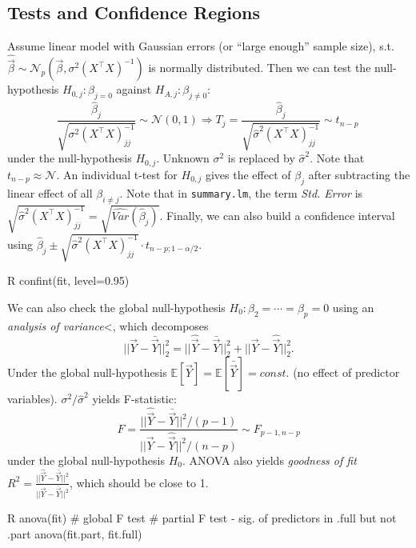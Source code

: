 \subsection{Tests and Confidence Regions}\label{subsec:tests_and_confidence_regions}
\begin{sectionbox}[T-test]\nospacing{}
  Assume linear model with Gaussian errors (or ``large enough'' sample size), s.t. $\hat{\vec{\beta}} \sim \mathcal{N}_{p}\left(\vec{\beta}, \sigma^{2}{(X^{\top}X)}^{-1}\right)$ is normally distributed.
  Then we can test the null-hypothesis $H_{0,j}: \beta_{j = 0}$ against $H_{A,j}: \beta_{j \neq 0}$:
  \[\frac{\hat \beta_{j}}{\sqrt{\sigma^{2}{{(X^{\top}X)}^{-1}_{jj}}}} \sim \mathcal{N}(0,1) \Rightarrow  T_{j} = \frac{\hat \beta_{j}}{\sqrt{\hat \sigma^{2}{{(X^{\top}X)}^{-1}_{jj}}}} \sim t_{n-p}\ \] under the null-hypothesis $H_{0,j}$. Unknown $\sigma^{2}$ is replaced by $\hat \sigma^{2}$. Note that $t_{n-p} \approx \mathcal{N}$.
  An individual t-test for $H_{0,j}$ gives the effect of $\beta_{j}$ after subtracting the linear effect of all $\beta_{i\neq j}$.
  Note that in \verb!summary.lm!, the term \emph{Std. Error} is $\sqrt{\hat \sigma^{2}{{(X^{\top}X)}^{-1}_{jj}}} = \sqrt{\hat{Var}(\hat \beta_{j})}$. Finally, we can also build a confidence interval using $\hat \beta_{j} \pm \sqrt{\hat \sigma^{2}{{(X^{\top}X)}^{-1}_{jj}}} \cdot t_{n-p;1-\alpha/2}$.
\begin{mintlinebox}{R}
  confint(fit, level=0.95)
\end{mintlinebox}
\end{sectionbox}

\begin{sectionbox}\nospacing{}
  We can also check the global null-hypothesis $H_{0}: \beta_{2} = \cdots = \beta_{p} = 0$ using an \emph{analysis of variance}<, which decomposes
  \[||\vec{Y} - \bar{\vec{Y}}||^{2}_{2} = ||\hat{\vec{Y}} - \bar{\vec{Y}}||^{2}_{2} + ||\vec{Y} - \hat{\vec{Y}}||^{2}_{2}.\]
  Under the global null-hypothesis $\mathbb{E}[\vec{Y}] = \mathbb{E}[\bar{\vec{Y}}] = const$. (no effect of predictor variables). $\sigma^{2}/ \hat \sigma^{2}$ yields F-statistic:
  \[F = \frac{||\hat{\vec{Y}} - \bar{\vec{Y}}||^{2}/(p-1)}{||\vec{Y} - \hat{\vec{Y}}||^{2} / (n-p)} \sim F_{p-1,n-p}\] under the global null-hypothesis $H_{0}$.
  ANOVA also yields \emph{goodness of fit} $R^{2} = \frac{||\hat{\vec{Y}} - \bar{\vec{Y}}||^{2}}{||\vec{Y} - \bar{\vec{Y}}||^{2}}$, which should be close to 1.
\begin{mintlinebox}{R}
  anova(fit) # global F test
  # partial F test - sig. of predictors in .full but not .part
  anova(fit.part, fit.full)
\end{mintlinebox}
\end{sectionbox}

